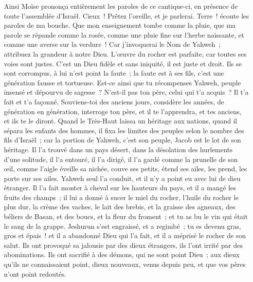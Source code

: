 \begin{multicols}{2}
Ainsi Moïse prononça entièrement les paroles de ce cantique-ci, en présence de toute l'assemblée d'Israël.
\VerseOne{}Cieux~! Prêtez l'oreille, et je parlerai. Terre~! écoute les paroles de ma bouche.
Que mon enseignement tombe comme la pluie, que ma parole se répande comme la rosée, comme une pluie fine sur l'herbe naissante, et comme une averse sur la verdure~!
Car j'invoquerai le Nom de Yahweh~; attribuez la grandeur à notre Dieu.
L'œuvre du rocher est parfaite, car toutes ses voies sont justes. C'est un Dieu fidèle et sans iniquité, il est juste et droit.
Ils se sont corrompus, à lui n'est point la faute~; la faute est à ses fils, c'est une génération fausse et tortueuse.
Est-ce ainsi que tu récompenses Yahweh, peuple insensé et dépourvu de sagesse~? N'est-il pas ton père, celui qui t'a acquis~? Il t'a fait et t'a façonné.
Souviens-toi des anciens jours, considère les années, de génération en génération, interroge ton père, et il te l'apprendra, et tes anciens, et ils te le diront.
Quand le Très-Haut laissa un héritage aux nations, quand il sépara les enfants des hommes, il fixa les limites des peuples selon le nombre des fils d'Israël~;
car la portion de Yahweh, c'est son peuple, Jacob est le lot de son héritage.
Il l'a trouvé dans un pays désert, dans la désolation des hurlements d'une solitude, il l'a entouré, il l'a dirigé, il l'a gardé comme la prunelle de son œil,
comme l'aigle éveille sa nichée, couve ses petits, étend ses ailes, les prend, les porte sur ses ailes.
Yahweh seul l'a conduit, et il n'y a point eu avec lui de dieu étranger.
Il l'a fait monter à cheval sur les hauteurs du pays, et il a mangé les fruits des champs~; il lui a donné à sucer le miel du rocher, l'huile du rocher le plus dur,
la crème des vaches, le lait des brebis, et la graisse des agneaux, des béliers de Basan, et des boucs, et la fleur du froment~; et tu as bu le vin qui était le sang de la grappe.
Jeshurun s'est engraissé, et a regimbé~; tu es devenu gras, gros et épais~! et il a abandonné Dieu qui l'a fait, et il a méprisé le rocher de son salut.
Ils ont provoqué sa jalousie par des dieux étrangers, ils l'ont irrité par des abominations.
Ils ont sacrifié à des démons, qui ne sont point Dieu~; aux dieux qu'ils ne connaissaient point, dieux nouveaux, venus depuis peu, et que vos pères n'ont point redoutés.

\end{multicols}
